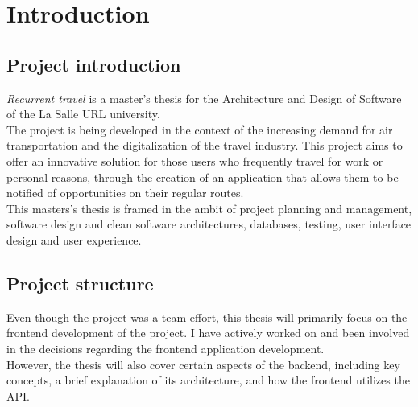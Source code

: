 \documentclass[../memory.tex]{subfiles}
\begin{document}
\chapter{Introduction}
\section{Project introduction}
\emph{Recurrent travel} is a master's thesis for the Architecture and Design of
Software of the La Salle URL university.
\\
The project is being developed in the context of the increasing demand for air
transportation and the digitalization of the travel industry. This project aims
to offer an innovative solution for those users who frequently travel for work
or personal reasons, through the creation of an application that allows them to
be notified of opportunities on their regular routes.
\\[8pt]
This masters's thesis is framed in the ambit of project planning and management,
software design and clean software architectures, databases, testing, user
interface design and user experience.
\section{Project structure}
Even though the project was a team effort, this thesis will primarily focus on
the frontend development of the project. I have actively worked on and been
involved in the decisions regarding the frontend application development.
\\[8pt]
However, the thesis will also cover certain aspects of the backend, including
key concepts, a brief explanation of its architecture, and how the frontend
utilizes the API.
\end{document}

